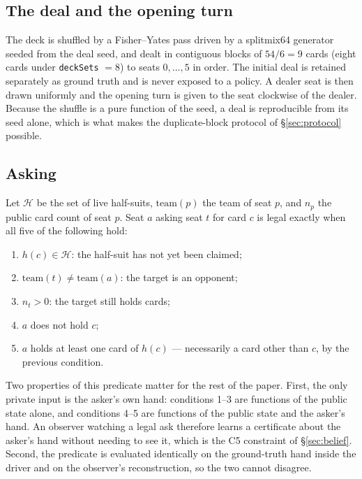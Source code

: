 \documentclass[11pt]{article}
\theoremstyle{definition}
\begin{document}
\subsection{The deal and the opening turn}

The deck is shuffled by a Fisher--Yates pass driven by a splitmix64 generator
seeded from the deal seed, and dealt in contiguous blocks of $54/6 = 9$ cards
(eight cards under \texttt{deckSets} $=8$) to seats $0,\dots,5$ in order. The
initial deal is retained separately as ground truth and is never exposed to a
policy. A dealer seat is then drawn uniformly and the opening turn is given to
the seat clockwise of the dealer. Because the shuffle is a pure function of the
seed, a deal is reproducible from its seed alone, which is what makes the
duplicate-block protocol of \S\ref{sec:protocol} possible.

\subsection{Asking}
\label{app:dialect-ask}

Let $\mathcal{H}$ be the set of live half-suits, $\mathrm{team}(p)$ the team of
seat $p$, and $n_p$ the public card count of seat $p$. Seat $a$ asking seat $t$
for card $c$ is legal exactly when all five of the following hold:

\begin{enumerate}
  \item $h(c) \in \mathcal{H}$: the half-suit has not yet been claimed;
  \item $\mathrm{team}(t) \neq \mathrm{team}(a)$: the target is an opponent;
  \item $n_t > 0$: the target still holds cards;
  \item $a$ does not hold $c$;
  \item $a$ holds at least one card of $h(c)$ --- necessarily a card other than
        $c$, by the previous condition.
\end{enumerate}

Two properties of this predicate matter for the rest of the paper. First, the
only private input is the asker's own hand: conditions 1--3 are functions of the
public state alone, and conditions 4--5 are functions of the public state and
the asker's hand. An observer watching a legal ask therefore learns a certificate
about the asker's hand without needing to see it, which is the C5 constraint of
\S\ref{sec:belief}. Second, the predicate is evaluated identically on the
ground-truth hand inside the driver and on the observer's reconstruction, so the
two cannot disagree.
\end{document}
